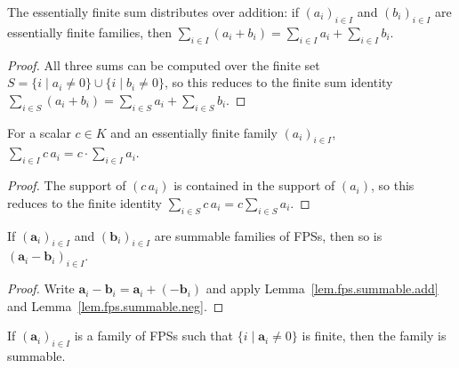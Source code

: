 \begin{lemma}
\label{lem.fps.essFinSum.add}
\leanhelper
\leanok
The essentially finite sum distributes over addition:
if $(a_i)_{i\in I}$ and $(b_i)_{i\in I}$ are essentially finite families,
then $\sum_{i\in I}(a_i + b_i) = \sum_{i\in I} a_i + \sum_{i\in I} b_i$.
\end{lemma}

\begin{proof}
\leanok
All three sums can be computed over the finite set
$S = \{i \mid a_i\neq 0\}\cup\{i \mid b_i\neq 0\}$,
so this reduces to the finite sum identity $\sum_{i\in S}(a_i+b_i)=\sum_{i\in S}a_i+\sum_{i\in S}b_i$.
\end{proof}

\begin{lemma}
\label{lem.fps.essFinSum.smul}
\leanhelper
\leanok
For a scalar $c\in K$ and an essentially finite family $(a_i)_{i\in I}$,
$\sum_{i\in I} c\, a_i = c\cdot\sum_{i\in I} a_i$.
\end{lemma}

\begin{proof}
\leanok
The support of $(c\,a_i)$ is contained in the support of $(a_i)$,
so this reduces to the finite identity $\sum_{i\in S}c\,a_i = c\sum_{i\in S}a_i$.
\end{proof}

\begin{lemma}
\label{lem.fps.summable.sub}
\leanhelper
\leanok
If $\left(\mathbf{a}_{i}\right)_{i\in I}$ and $\left(\mathbf{b}_{i}\right)_{i\in I}$
are summable families of FPSs, then so is $\left(\mathbf{a}_{i}-\mathbf{b}_{i}\right)_{i\in I}$.
\end{lemma}

\begin{proof}
\leanok
Write $\mathbf{a}_i - \mathbf{b}_i = \mathbf{a}_i + (-\mathbf{b}_i)$
and apply Lemma~\ref{lem.fps.summable.add} and Lemma~\ref{lem.fps.summable.neg}.
\end{proof}

\begin{lemma}
\label{lem.fps.summable.of_essfin}
\leanhelper
\leanok
If $(\mathbf{a}_i)_{i\in I}$ is a family of FPSs such that
$\{i \mid \mathbf{a}_i \neq 0\}$ is finite, then the family is summable.
\end{lemma}

